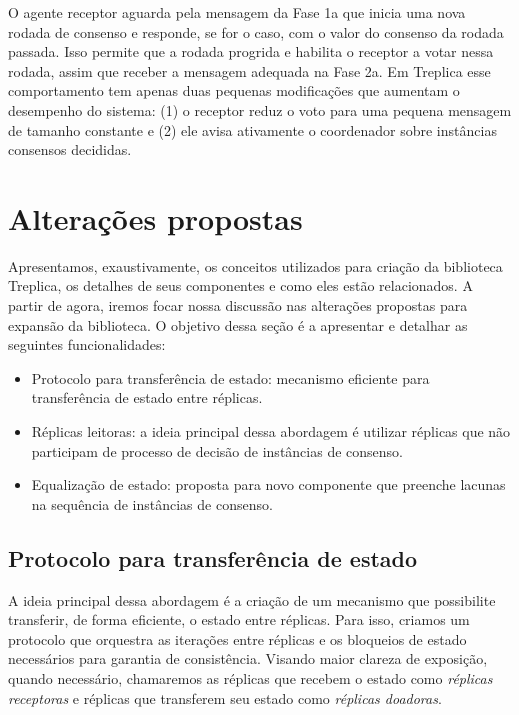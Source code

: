 O agente receptor aguarda pela mensagem da Fase 1a que inicia uma nova rodada de consenso
e responde, se for o caso, com o valor do consenso da rodada passada. Isso permite que a
rodada progrida e habilita o receptor a votar nessa rodada, assim que receber a mensagem
adequada na Fase 2a. Em Treplica esse comportamento tem apenas duas pequenas modificações
que aumentam o desempenho do sistema: (1) o receptor reduz o voto para uma pequena
mensagem de tamanho constante e (2) ele avisa ativamente o coordenador sobre instâncias
consensos decididas.

\section{Alterações propostas}\label{sec:alteracoes_propostas}

Apresentamos, exaustivamente, os conceitos utilizados para criação da biblioteca Treplica,
os detalhes de seus componentes e como eles estão relacionados. A partir de agora, iremos
focar nossa discussão nas alterações propostas para expansão da biblioteca. O objetivo
dessa seção é a apresentar e detalhar as seguintes funcionalidades:

\begin{itemize}
  \item Protocolo para transferência de estado: mecanismo eficiente para transferência de
    estado entre réplicas.
  \item Réplicas leitoras: a ideia principal dessa abordagem é utilizar réplicas que não
    participam de processo de decisão de instâncias de consenso.
  \item Equalização de estado: proposta para novo componente que preenche lacunas na
    sequência de instâncias de consenso.
\end{itemize}

\subsection{Protocolo para transferência de estado}

A ideia principal dessa abordagem é a criação de um mecanismo que possibilite transferir, de
forma eficiente, o estado entre réplicas. Para isso, criamos um protocolo que orquestra as
iterações entre réplicas e os bloqueios de estado necessários para garantia de
consistência. Visando maior clareza de exposição, quando necessário, chamaremos as
réplicas que recebem o estado como \emph{réplicas receptoras} e réplicas que transferem
seu estado como \emph{réplicas doadoras}.

